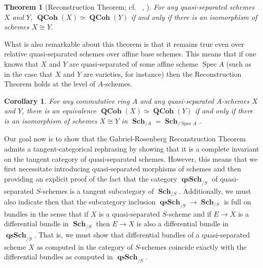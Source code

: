 \documentclass{amsart}
\newtheorem{Theorem}[equation]{Theorem}
\newtheorem{corollary}[equation]{Corollary}
\theoremstyle{definition}
\DeclareMathOperator{\qsSch}{\mathbf{qsSch}}
\DeclareMathOperator{\Spec}{Spec}
\DeclareMathOperator{\Sch}{\mathbf{Sch}}
\DeclareMathOperator{\QCoh}{\mathbf{QCoh}}
\numberwithin{equation}{subsection}
\begin{document}
\begin{Theorem}[{Reconstruction Theorem; cf.~ \cite{RosenbergSpectra}, \cite{BrandenbergReconstruction}}]\label{Thm: Reconstruction Theorem}
For any quasi-separated schemes $X$ and $Y$, $\QCoh(X) \simeq \QCoh(Y)$ if and only if there is an isomorphism of schemes $X \cong Y$.
\end{Theorem}
What is also remarkable about  this theorem is that it remains true even over relative quasi-separated schemes over affine base schemes. This means that if one knows that $X$ and $Y$ are quasi-separated of some affine scheme $\Spec A$ (such as in the case that $X$ and $Y$ are varieties, for instance) then the Reconstruction Theorem holds at the level of $A$-schemes. 
\begin{corollary}\label{Cor: Relative Reconstruction Theorem}
For any commutative ring $A$ and any quasi-separated $A$-schemes $X$ and $Y$, there is an equivalence $\QCoh(X) \simeq \QCoh(Y)$ if and only if there is an isomorphism of schemes $X \cong Y$ in $\Sch_{/A} = \Sch_{/\Spec A}$.
\end{corollary}
%

Our goal now is to show that the Gabriel-Rosenberg Reconstruction Theorem admits a tangent-categorical rephrasing by showing that it is a complete invariant on the tangent category of quasi-separated schemes. However, this means that we first necessitate introducing quasi-separated morphisms of schemes and then providing an explicit proof of the fact that the category $\qsSch_{/S}$ of quasi-separated $S$-schemes is a tangent subcategory of $\Sch_{/S}$. Additionally, we must also indicate then that the subcategory inclusion $\qsSch_{/S} \to \Sch_{/S}$ is full on bundles in the sense that if $X$ is a quasi-separated $S$-scheme and if $E \to X$ is a differential bundle in $\Sch_{/S}$ then $E \to X$ is also a differential bundle in $\qsSch_{/S}$. That is, we must show that differential bundles of a quasi-separated scheme $X$ as computed in the category of $S$-schemes coincide exactly with the differential bundles as computed in $\qsSch_{/S}$.
\end{document}
